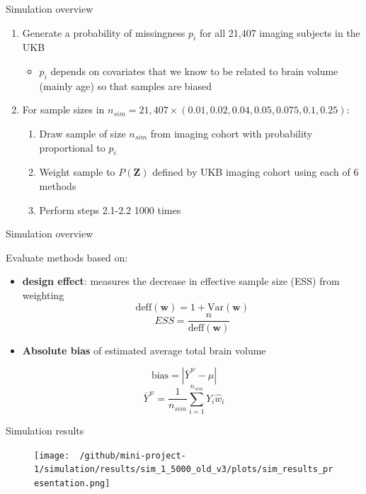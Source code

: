 \documentclass[
  ignorenonframetext,
]{beamer}
\providecommand{\tightlist}{%
  \setlength{\itemsep}{0pt}\setlength{\parskip}{0pt}}
\begin{document}
\begin{frame}{Simulation overview}
\protect\hypertarget{simulation-overview}{}

\begin{enumerate}
\tightlist
\item
  Generate a probability of missingness \(p_i\) for all 21,407 imaging
  subjects in the UKB

  \begin{itemize}
  \tightlist
  \item
    \(p_i\) depends on covariates that we know to be related to brain
    volume (mainly age) so that samples are biased
  \end{itemize}
\item
  For sample sizes in
  \(n_{sim} = 21,407 \times (0.01, 0.02, 0.04,0.05,0.075, 0.1, 0.25)\):

  \begin{enumerate}
  \tightlist
  \item
    Draw sample of size \(n_{sim}\) from imaging cohort with probability
    proportional to \(p_i\)
  \item
    Weight sample to \(P(\mathbf{Z})\) defined by UKB imaging cohort
    using each of 6 methods
  \item
    Perform steps 2.1-2.2 1000 times
  \end{enumerate}
\end{enumerate}

\end{frame}

\begin{frame}{Simulation overview}
\protect\hypertarget{simulation-overview-1}{}

Evaluate methods based on:

\begin{itemize}
\item
  \textbf{design effect}: measures the decrease in effective sample size
  (ESS) from weighting
  \[\text{deff}(\mathbf{w}) = 1 + \text{Var}(\mathbf{w})\]
  \[ESS = \frac{n}{\text{deff}(\mathbf{w})}\]
\item
  \textbf{Absolute bias} of estimated average total brain volume
\end{itemize}

\[\text{bias} = |\bar{Y}^w - \mu|\]
\[\bar{Y}^w = \frac{1}{n_{sim}}\sum_{i = 1}^{n_{sim}} Y_i \hat{w}_i\]

\end{frame}

\begin{frame}{Simulation results}
\protect\hypertarget{simulation-results}{}

\begin{figure}
\centering
\texttt{[image: ~/github/mini-project-1/simulation/results/sim\_1\_5000\_old\_v3/plots/sim\_results\_presentation.png]}
\end{figure}

\end{frame}
\end{document}

